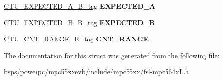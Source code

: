 \begin{DoxyCompactItemize}
\begin{tabbing}
\end{tabbing}\item 
\mbox{\label{structCTU__struct__tag_adbcf39d9e8f40fc884adfd667d56a5db}} 
\mbox{\hyperlink{unionCTU__EXPECTED__A__16B__tag}{C\+T\+U\+\_\+\+E\+X\+P\+E\+C\+T\+E\+D\+\_\+\+A\+\_\+B\+\_\+tag}} {\bfseries E\+X\+P\+E\+C\+T\+E\+D\+\_\+A}
\item 
\mbox{\label{structCTU__struct__tag_a5c7f086a0fb12f14960e97c334b8ebdc}} 
\mbox{\hyperlink{unionCTU__EXPECTED__B__16B__tag}{C\+T\+U\+\_\+\+E\+X\+P\+E\+C\+T\+E\+D\+\_\+\+B\+\_\+B\+\_\+tag}} {\bfseries E\+X\+P\+E\+C\+T\+E\+D\+\_\+B}
\item 
\mbox{\label{structCTU__struct__tag_ad670796caefdbda0185277aeda5732bc}} 
\mbox{\hyperlink{unionCTU__CNT__RANGE__16B__tag}{C\+T\+U\+\_\+\+C\+N\+T\+\_\+\+R\+A\+N\+G\+E\+\_\+B\+\_\+tag}} {\bfseries C\+N\+T\+\_\+\+R\+A\+N\+GE}
\end{DoxyCompactItemize}


The documentation for this struct was generated from the following file\+:\begin{DoxyCompactItemize}
\item 
bsps/powerpc/mpc55xxevb/include/mpc55xx/fsl-\/mpc564x\+L.\+h\end{DoxyCompactItemize}
